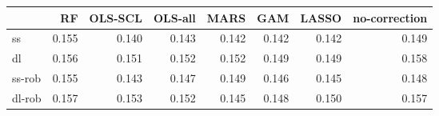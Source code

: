 \begin{tabular}{lrrrrrrr}
\toprule
 & RF & OLS-SCL & OLS-all & MARS & GAM & LASSO & no-correction \\
\midrule
ss & {\cellcolor[HTML]{000000}} \color[HTML]{F1F1F1} 0.155 & {\cellcolor[HTML]{F1F1F1}} \color[HTML]{000000} 0.140 & {\cellcolor[HTML]{CACACA}} \color[HTML]{000000} 0.143 & {\cellcolor[HTML]{DDDDDD}} \color[HTML]{000000} 0.142 & {\cellcolor[HTML]{D4D4D4}} \color[HTML]{000000} 0.142 & {\cellcolor[HTML]{DDDDDD}} \color[HTML]{000000} 0.142 & {\cellcolor[HTML]{6A6A6A}} \color[HTML]{F1F1F1} 0.149 \\
dl & {\cellcolor[HTML]{222222}} \color[HTML]{F1F1F1} 0.156 & {\cellcolor[HTML]{ADADAD}} \color[HTML]{000000} 0.151 & {\cellcolor[HTML]{A7A7A7}} \color[HTML]{F1F1F1} 0.152 & {\cellcolor[HTML]{A7A7A7}} \color[HTML]{F1F1F1} 0.152 & {\cellcolor[HTML]{F1F1F1}} \color[HTML]{000000} 0.149 & {\cellcolor[HTML]{EDEDED}} \color[HTML]{000000} 0.149 & {\cellcolor[HTML]{000000}} \color[HTML]{F1F1F1} 0.158 \\
ss-rob & {\cellcolor[HTML]{000000}} \color[HTML]{F1F1F1} 0.155 & {\cellcolor[HTML]{F1F1F1}} \color[HTML]{000000} 0.143 & {\cellcolor[HTML]{A2A2A2}} \color[HTML]{F1F1F1} 0.147 & {\cellcolor[HTML]{878787}} \color[HTML]{F1F1F1} 0.149 & {\cellcolor[HTML]{C3C3C3}} \color[HTML]{000000} 0.146 & {\cellcolor[HTML]{C5C5C5}} \color[HTML]{000000} 0.145 & {\cellcolor[HTML]{8F8F8F}} \color[HTML]{F1F1F1} 0.148 \\
dl-rob & {\cellcolor[HTML]{000000}} \color[HTML]{F1F1F1} 0.157 & {\cellcolor[HTML]{4E4E4E}} \color[HTML]{F1F1F1} 0.153 & {\cellcolor[HTML]{696969}} \color[HTML]{F1F1F1} 0.152 & {\cellcolor[HTML]{F1F1F1}} \color[HTML]{000000} 0.145 & {\cellcolor[HTML]{A8A8A8}} \color[HTML]{F1F1F1} 0.148 & {\cellcolor[HTML]{888888}} \color[HTML]{F1F1F1} 0.150 & {\cellcolor[HTML]{060606}} \color[HTML]{F1F1F1} 0.157 \\
\bottomrule
\end{tabular}
